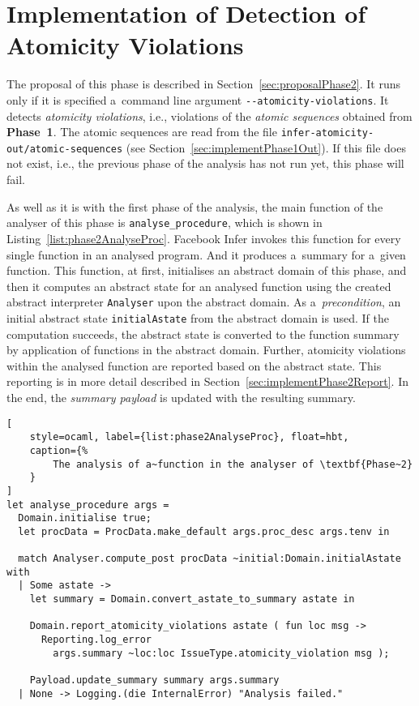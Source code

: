 \section{Implementation of Detection of Atomicity Violations}
\label{sec:implementPhase2}

The proposal of this phase is described in Section~\ref{sec:proposalPhase2}.
It runs only if it is specified a~command line argument
\texttt{{-}{-}atomicity-violations}. It detects \emph{atomicity violations},
i.e., violations of the \emph{atomic sequences} obtained from \textbf{Phase~1}.
The atomic sequences are read from the file
\texttt{infer-atomicity-out/atomic-sequences} (see
Section~\ref{sec:implementPhase1Out}). If this file does not exist,
i.e., the previous phase of the analysis has not run yet, this phase will
fail.

As well as it is with the first phase of the analysis, the main function
of the analyser of this phase is \texttt{analyse\_procedure}, which is shown
in Listing~\ref{list:phase2AnalyseProc}. Facebook Infer invokes this
function for every single function in an analysed program. And it produces
a~summary for a~given function. This function, at first, initialises an
abstract domain of this phase, and then it computes an abstract state
for an analysed function using the created abstract interpreter
\texttt{Analyser} upon the abstract domain. As a~\emph{precondition},
an initial abstract state \texttt{initialAstate} from the abstract domain
is used. If the computation succeeds, the abstract state is converted
to the function summary by application of functions in the abstract
domain. Further, atomicity violations within the analysed function
are reported based on the abstract state. This reporting is in more
detail described in Section~\ref{sec:implementPhase2Report}. In the end,
the \emph{summary payload} is updated with the resulting summary.

\begin{lstlisting}[
    style=ocaml, label={list:phase2AnalyseProc}, float=hbt,
    caption={%
        The analysis of a~function in the analyser of \textbf{Phase~2}
    }
]
let analyse_procedure args =
  Domain.initialise true;
  let procData = ProcData.make_default args.proc_desc args.tenv in

  match Analyser.compute_post procData ~initial:Domain.initialAstate with
  | Some astate ->
    let summary = Domain.convert_astate_to_summary astate in

    Domain.report_atomicity_violations astate ( fun loc msg ->
      Reporting.log_error
        args.summary ~loc:loc IssueType.atomicity_violation msg );

    Payload.update_summary summary args.summary
  | None -> Logging.(die InternalError) "Analysis failed."
\end{lstlisting}

